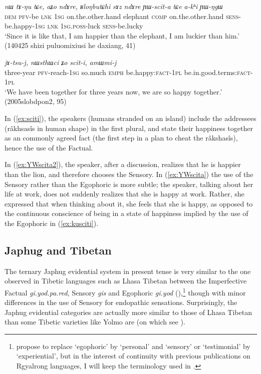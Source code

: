 \documentclass[oldfontcommands,oneside,a4paper,11pt]{article}
\newcommand{\ipa}[1]{{\phon\textit{#1}}} %
\newcommand{\refb}[1]{(\ref{#1})}
\begin{document}
\begin{exe}
\ex \label{ex:YWscita2}
\gll 
\ipa{nɯ} 	\ipa{tɤ-ŋu} 	\ipa{tɕe,} 	\ipa{aʑo} 	\ipa{ndɤre,} 	\ipa{ʁloŋbutɕhi} 	\ipa{sɤz} 	\ipa{ndɤre} 	\ipa{ɲɯ-scit-a} 	\ipa{tɕe} 	\ipa{a-kʰi} 	\ipa{ɲɯ-ŋgɯ} \\
\textsc{dem} \textsc{pfv}-be \textsc{lnk} \textsc{1sg} on.the.other.hand elephant \textsc{comp} on.the.other.hand \textsc{sens}-be.happy-\textsc{1sg} \textsc{lnk} \textsc{1sg.poss}-luck \textsc{sens}-be.lucky \\
\glt `Since it is like that, I am happier than the elephant, I am luckier than him.' (140425 shizi puluomixiusi he daxiang, 41)
\end{exe}


\begin{exe}
\ex \label{ex:sciti}
\gll \ipa{χsɯ-xpa} 	\ipa{jɤ-tsu-j,} 	\ipa{nɯsthɯci} 	\ipa{ʑo} \ipa{scit-i,} 	\ipa{amɯmi-j}  \\
three-year \textsc{pfv}-reach-\textsc{1sg} so.much \textsc{emph} be.happy:\textsc{fact-1pl} be.in.good.terms:\textsc{fact-1pl} \\
\glt `We have been together for three years now, we are so happy together.' (2005slobdpon2, 95)
\end{exe}

In \refb{ex:sciti}, the speakers (humans stranded on an island) include the addressees (râkhsasîs in human shape) in the first plural, and state their happiness together as an commonly agreed fact (the first step in a plan to cheat the râkshasîs), hence the use of the Factual. 

In \refb{ex:YWscita2}, the speaker, after a discussion, realizes that he is happier than the lion, and therefore chooses the Sensory. In \refb{ex:YWscita} the use of the Sensory rather than the Egophoric is more subtle; the speaker, talking about her life at work, does not suddenly realizes that she is happy at work. Rather, she expressed that when thinking about it, she feels that she is happy, as opposed to the continuous conscience of being in a state of happiness implied by the use of the Egophoric in \refb{ex:kusciti}.

\subsection{Japhug and Tibetan}
The ternary Japhug evidential system in present tense is very similar to the one observed in Tibetic languages such as Lhasa Tibetan between the Imperfective Factual \ipa{gi.yod.pa.red}, Sensory \textit{gis} and Egophoric \ipa{gi.yod} (\citealt[295+]{tournadre08conjunct}),\footnote{\citet{hill17evidential} propose to replace `egophoric' by ‘personal’ and `sensory' or `testimonial' by ‘experiential’, but in the interest of continuity with previous publications on Rgyalrong languages, I will keep the terminology used in \citet{jacques17sketch}. } though with minor differences in the use of Sensory for endopathic sensations. Surprisingly, the Japhug evidential categories are actually more similar to those of Lhasa Tibetan than some Tibetic varieties like Yolmo are (on which see \citealt{gawne13copulas}). 
\end{document}
